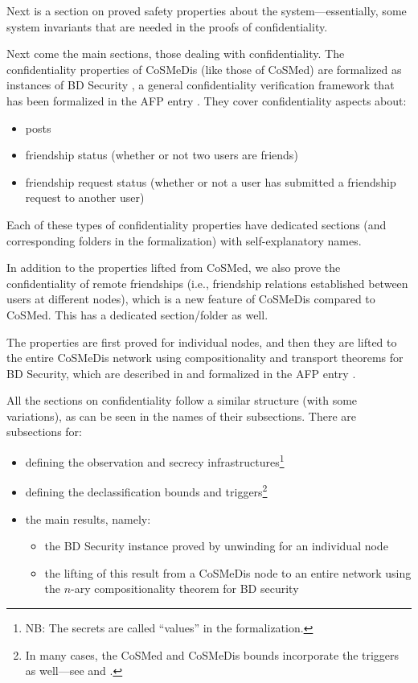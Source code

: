 \documentclass[11pt,a4paper]{article}
\begin{document}
Next is a section on proved safety properties about the system---essentially, some system invariants that are needed in the proofs of confidentiality.

Next come the main sections, those dealing with confidentiality.
The confidentiality properties of CoSMeDis (like those of CoSMed) are formalized as instances of BD Security \cite{BDsecurity-ITP2021}, a general confidentiality verification framework that has been formalized in the AFP entry \cite{BDSecurity-AFP}. They cover confidentiality aspects about:
\begin{itemize}
	\item posts
    \item friendship status (whether or not two users are friends)
    \item friendship request status (whether or not a user has submitted a friendship request to another user)
\end{itemize}
%
Each of these types of confidentiality properties have dedicated sections (and corresponding folders in the formalization) with self-explanatory names.

In addition to the properties lifted from CoSMed, we also prove the confidentiality of remote friendships (i.e., friendship relations established between users at different nodes), which is a new feature of CoSMeDis compared to CoSMed. This has a dedicated section/folder as well.
%

The properties are first proved for individual nodes, and then they are lifted to
the entire CoSMeDis network using compositionality and transport theorems for BD Security, which are
described in \cite{cosmedis-SandP2017} and formalized in the AFP entry \cite{BDSecuritycomp-AFP}.

All the sections on confidentiality follow a similar structure (with some variations), as can be seen in the names of their subsections. There are subsections for:
\begin{itemize}
	\item defining the observation and secrecy infrastructures\footnote{NB:  The secrets are called ``values'' in the formalization.}
	\item defining the declassification bounds and triggers\footnote{In many cases, the CoSMed and CoSMeDis bounds incorporate the triggers as well---see \cite[Appendix~C]{cosmedis-SandP2017} and \cite[Section~3.3]{cosmed-jar2018}.}
	\item the main results, namely:
	  \begin{itemize}
		\item the BD Security instance proved by unwinding for an individual node
		\item the lifting of this result from a CoSMeDis node to an entire
		network  using the $n$-ary compositionality theorem for BD security
	  \end{itemize}
\end{itemize}
\end{document}
